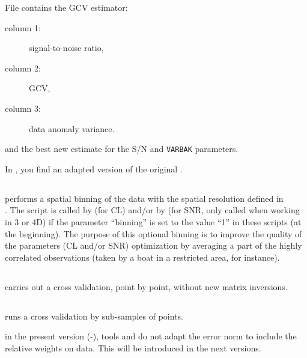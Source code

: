 File  contains the GCV estimator:
\begin{description}
\item[column 1:] signal-to-noise ratio, 
\item[column 2:] GCV,
\item[column 3:] data anomaly variance.
\end{description}  
and  the best new estimate for the S/N and \texttt{VARBAK} parameters.

In , you find an adapted version of the original .

\subsection{}

 performs a spatial binning of the data with the spatial resolution defined in \\ . 
The script is called by  (for CL) and/or by  
(for SNR, only called when working in 3 or 4D) 
if the parameter ``binning'' is set to the value
``1'' in these scripts (at the beginning). The purpose of this optional binning is to improve the quality 
of the parameters (CL and/or SNR) optimization by averaging a part of the highly correlated observations 
(taken by a boat in a restricted area, for instance).  

\subsection{}

 carries out a cross validation, point by point, without new matrix inversions. 

\subsection{}

 runs a cross validation by sub-samples of points.


\info in the present version (\diva-\divaversion), tools   and   
do not adapt the error norm to include the relative weights on data. This will be introduced in the next versions.


